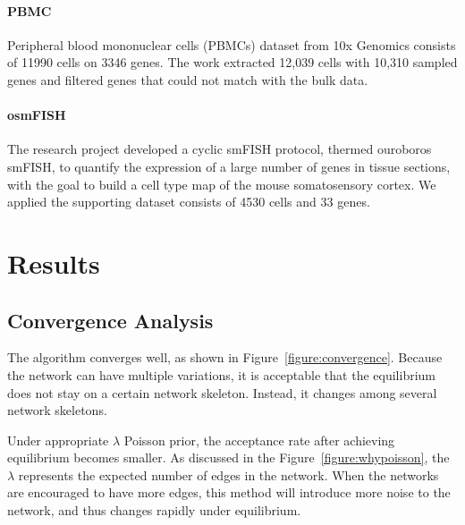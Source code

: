 \documentclass{bioinfo}
\begin{document}
\paragraph{PBMC}
Peripheral blood mononuclear cells (PBMCs) dataset from 10x Genomics\citep{x10} consists of 11990 cells on 3346 genes. The work \cite{gen2018} extracted 12,039 cells with 10,310 sampled genes and filtered genes that could not match with the bulk data.

\paragraph{osmFISH}
The research project \cite{smfish} developed a cyclic smFISH protocol, thermed ouroboros smFISH, to quantify the expression of a large number of genes in tissue sections, with the goal to build a cell type map of the mouse somatosensory cortex. We applied the supporting dataset consists of 4530 cells and 33 genes.

\section{Results}
\subsection{Convergence Analysis}
The algorithm converges well, as shown in Figure~\ref{figure:convergence}. Because the network can have multiple variations, it is acceptable that the equilibrium does not stay on a certain network skeleton. Instead, it changes among several network skeletons.

Under appropriate $\lambda$ Poisson prior, the acceptance rate after achieving equilibrium becomes smaller. As discussed in the Figure~\ref{figure:whypoisson}, the $\lambda$ represents the expected number of edges in the network. When the networks are encouraged to have more edges, this method will introduce more noise to the network, and thus changes rapidly under equilibrium.
\end{document}
